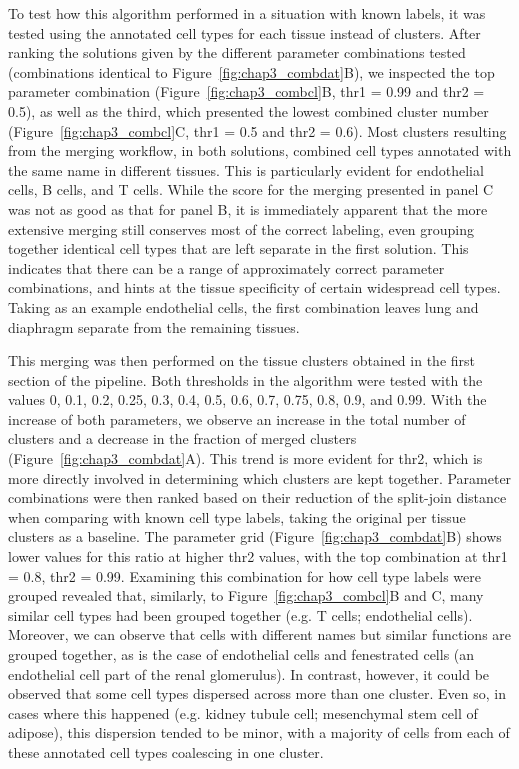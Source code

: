 To test how this algorithm performed in a situation with known labels, it was tested using the annotated cell types for each tissue instead of clusters. After ranking the solutions given by the different parameter combinations tested (combinations identical to Figure~\ref{fig:chap3_combdat}B), we inspected the top parameter combination (Figure~\ref{fig:chap3_combcl}B, thr1 = 0.99 and thr2 = 0.5), as well as the third, which presented the lowest combined cluster number (Figure~\ref{fig:chap3_combcl}C, thr1 = 0.5 and thr2 = 0.6). Most clusters resulting from the merging workflow, in both solutions, combined cell types annotated with the same name in different tissues. This is particularly evident for endothelial cells, B cells, and T cells. While the score for the merging  presented in panel C was not as good as that for panel B, it is immediately apparent that the more extensive merging still conserves most of the correct labeling, even grouping together identical cell types that are left separate in the first solution. This indicates that there can be a range of approximately correct parameter combinations, and hints at the tissue specificity of certain widespread cell types. Taking as an example endothelial cells, the first combination leaves lung and diaphragm separate from the remaining tissues.

This merging was then performed on the tissue clusters obtained in the first section of the pipeline. Both thresholds in the algorithm were tested with the values 0, 0.1, 0.2, 0.25, 0.3, 0.4, 0.5, 0.6, 0.7, 0.75, 0.8, 0.9, and 0.99. With the increase of both parameters, we observe an increase in the total number of clusters and a decrease in the fraction of merged clusters (Figure~\ref{fig:chap3_combdat}A). This trend is more evident for thr2, which is more directly involved in determining which clusters are kept together. Parameter combinations were then ranked based on their reduction of the split-join distance when comparing with known cell type labels, taking the original per tissue clusters as a baseline. The parameter grid (Figure~\ref{fig:chap3_combdat}B) shows lower values for this ratio at higher thr2 values, with the top combination at thr1 = 0.8, thr2 = 0.99. Examining this combination for how cell type labels were grouped revealed that, similarly, to Figure~\ref{fig:chap3_combcl}B and C, many similar cell types had been grouped together (e.g. T cells; endothelial cells). Moreover, we can observe that cells with different names but similar functions are grouped together, as is the case of endothelial cells and fenestrated cells (an endothelial cell part of the renal glomerulus). In contrast, however, it could be observed that some cell types dispersed across more than one cluster. Even so, in cases where this happened (e.g. kidney tubule cell; mesenchymal stem cell of adipose), this dispersion tended to be minor, with a majority of cells from each of these annotated cell types coalescing in one cluster.

